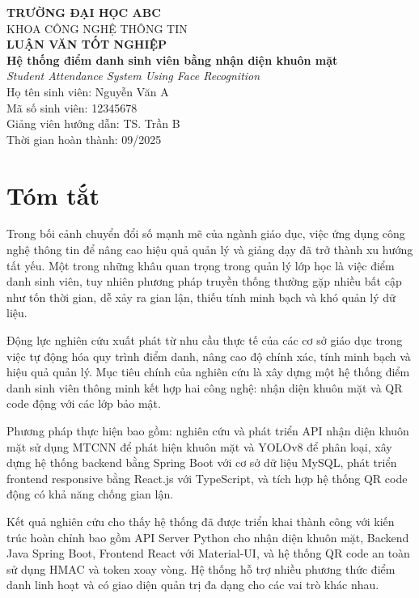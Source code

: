 \documentclass[12pt,a4paper]{report}
\begin{document}
\begin{titlepage}
    \centering
    {\bfseries\LARGE TRƯỜNG ĐẠI HỌC ABC\\[1em]}
    {\Large KHOA CÔNG NGHỆ THÔNG TIN\\[2em]}
    {\Huge\bfseries LUẬN VĂN TỐT NGHIỆP\\[1em]}
    {\Large\bfseries Hệ thống điểm danh sinh viên bằng nhận diện khuôn mặt\\}
    {\large\itshape Student Attendance System Using Face Recognition\\[2em]}
    \vfill
    {\large Họ tên sinh viên: Nguyễn Văn A\\}
    {\large Mã số sinh viên: 12345678\\[1em]}
    {\large Giảng viên hướng dẫn: TS. Trần B\\[1em]}
    {\large Thời gian hoàn thành: 09/2025\\}
    \vfill
\end{titlepage}

\chapter*{Tóm tắt}
Trong bối cảnh chuyển đổi số mạnh mẽ của ngành giáo dục, việc ứng dụng công nghệ thông tin để nâng cao hiệu quả quản lý và giảng dạy đã trở thành xu hướng tất yếu. Một trong những khâu quan trọng trong quản lý lớp học là việc điểm danh sinh viên, tuy nhiên phương pháp truyền thống thường gặp nhiều bất cập như tốn thời gian, dễ xảy ra gian lận, thiếu tính minh bạch và khó quản lý dữ liệu.

Động lực nghiên cứu xuất phát từ nhu cầu thực tế của các cơ sở giáo dục trong việc tự động hóa quy trình điểm danh, nâng cao độ chính xác, tính minh bạch và hiệu quả quản lý. Mục tiêu chính của nghiên cứu là xây dựng một hệ thống điểm danh sinh viên thông minh kết hợp hai công nghệ: nhận diện khuôn mặt và QR code động với các lớp bảo mật.

Phương pháp thực hiện bao gồm: nghiên cứu và phát triển API nhận diện khuôn mặt sử dụng MTCNN để phát hiện khuôn mặt và YOLOv8 để phân loại, xây dựng hệ thống backend bằng Spring Boot với cơ sở dữ liệu MySQL, phát triển frontend responsive bằng React.js với TypeScript, và tích hợp hệ thống QR code động có khả năng chống gian lận.

Kết quả nghiên cứu cho thấy hệ thống đã được triển khai thành công với kiến trúc hoàn chỉnh bao gồm API Server Python cho nhận diện khuôn mặt, Backend Java Spring Boot, Frontend React với Material-UI, và hệ thống QR code an toàn sử dụng HMAC và token xoay vòng. Hệ thống hỗ trợ nhiều phương thức điểm danh linh hoạt và có giao diện quản trị đa dạng cho các vai trò khác nhau.
\end{document}

